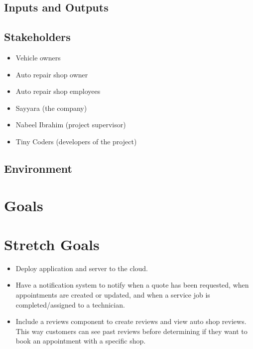 \documentclass{article}
\begin{document}
\subsection{Inputs and Outputs}


\subsection{Stakeholders}
\begin{itemize}
	\item Vehicle owners
	\item Auto repair shop owner
	\item Auto repair shop employees
	\item Sayyara (the company)
	\item Nabeel Ibrahim (project supervisor)
	\item Tiny Coders (developers of the project)
\end{itemize}

\subsection{Environment}


\section{Goals}

\section{Stretch Goals}
\begin{itemize}
	\item Deploy application and server to the cloud.
	\item Have a notification system to notify when a quote has been requested, when appointments are created
	      or updated, and when a service job is completed/assigned to a technician.
	\item Include a reviews component to create reviews and view auto shop reviews. This way customers can
	      see past reviews before determining if they want to book an appointment with a specific shop.
\end{itemize}
\end{document}
